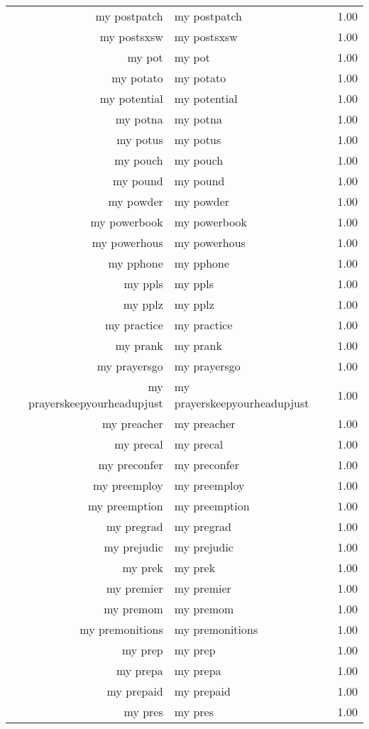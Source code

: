 \begin{table}[ht]
\begin{tabular}{rlr}
  my postpatch & my postpatch & 1.00 \\ 
  my postsxsw & my postsxsw & 1.00 \\ 
  my pot & my pot & 1.00 \\ 
  my potato & my potato & 1.00 \\ 
  my potential & my potential & 1.00 \\ 
  my potna & my potna & 1.00 \\ 
  my potus & my potus & 1.00 \\ 
  my pouch & my pouch & 1.00 \\ 
  my pound & my pound & 1.00 \\ 
  my powder & my powder & 1.00 \\ 
  my powerbook & my powerbook & 1.00 \\ 
  my powerhous & my powerhous & 1.00 \\ 
  my pphone & my pphone & 1.00 \\ 
  my ppls & my ppls & 1.00 \\ 
  my pplz & my pplz & 1.00 \\ 
  my practice & my practice & 1.00 \\ 
  my prank & my prank & 1.00 \\ 
  my prayersgo & my prayersgo & 1.00 \\ 
  my prayerskeepyourheadupjust & my prayerskeepyourheadupjust & 1.00 \\ 
  my preacher & my preacher & 1.00 \\ 
  my precal & my precal & 1.00 \\ 
  my preconfer & my preconfer & 1.00 \\ 
  my preemploy & my preemploy & 1.00 \\ 
  my preemption & my preemption & 1.00 \\ 
  my pregrad & my pregrad & 1.00 \\ 
  my prejudic & my prejudic & 1.00 \\ 
  my prek & my prek & 1.00 \\ 
  my premier & my premier & 1.00 \\ 
  my premom & my premom & 1.00 \\ 
  my premonitions & my premonitions & 1.00 \\ 
  my prep & my prep & 1.00 \\ 
  my prepa & my prepa & 1.00 \\ 
  my prepaid & my prepaid & 1.00 \\ 
  my pres & my pres & 1.00 \\ 

\end{tabular}
\end{table}

